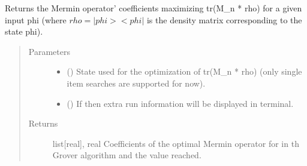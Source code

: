 \documentclass[letterpaper,10pt,english]{sphinxmanual}
\begin{document}
\begin{fulllineitems}
\label{\detokenize{mermin_eval:mermin_eval.mermin_coef_opti_all}}
Returns the Mermin operator’ coefficients maximizing tr(M\_n * rho) for a 
given input phi (where \(rho = |phi><phi|\) is the density matrix corresponding
to the state phi).
\begin{quote}\begin{description}
\item[{Parameters}] \leavevmode\begin{itemize}
\item {} 
 (\sphinxstyleliteralemphasis{\sphinxupquote{{[}}}\sphinxstyleliteralemphasis{\sphinxupquote{{]}}}) \textendash{} State used for the optimization of tr(M\_n * rho)
(only single item searches are supported for now).

\item {} 
 () \textendash{} If  then extra run information will be displayed in 
terminal.

\end{itemize}

\item[{Returns}] \leavevmode
list{[}real{]}, real \textendash{} Coefficients of the optimal Mermin operator for 
 in th Grover algorithm and the value reached.

\end{description}\end{quote}

\end{fulllineitems}

\end{document}
